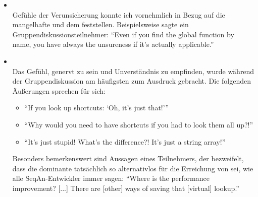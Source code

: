 \begin{itemize}
\begin{itemize}
    \item[\codebullet{apiua://code/-9223372036854775134}] \textbf{} \\
    Gefühle der Verunsicherung konnte ich vornehmlich in Bezug auf die mangelhafte  und dem  feststellen. Beispielsweise sagte ein Gruppendiskussionsteilnehmer: ``Even if you find the global function by name, you have always the unsureness if it's actually applicable.''
    
    \item[\codebullet{apiua://code/-9223372036854775440}] \textbf{} \\
    Das Gefühl, genervt zu sein und Unverständnis zu empfinden, wurde während der Gruppendiskussion am häufigsten zum Ausdruck gebracht. Die folgenden Äußerungen sprechen für sich:
    \begin{itemize}
      \item ``If you look up shortcuts: `Oh, it's just that!'''
      \item ``Why would you need to have shortcuts if you had to look them all up?!''
      \item ``It's just stupid! What's the difference?! It's just a string array!''
    \end{itemize}
    
    Besonders bemerkenswert sind Aussagen eines Teilnehmers, der bezweifelt, dass die dominante   tatsächlich so alternativlos für die Erreichung von  sei, wie alle SeqAn-Entwickler immer sagen: ``Where is the performance improvement? [...] There are [other] ways of saving that [virtual] lookup.''
    

\end{itemize}
\end{itemize}
